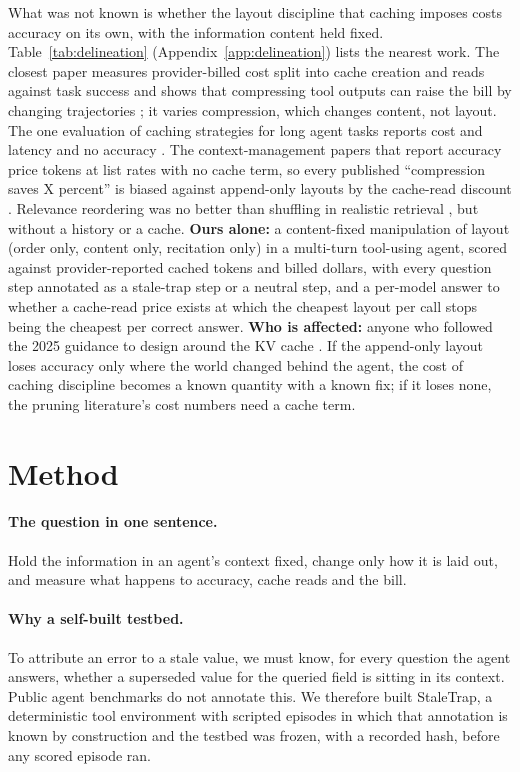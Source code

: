 What was not known is whether the layout discipline that caching imposes costs accuracy on its own, with the information content held fixed. Table~\ref{tab:delineation} (Appendix~\ref{app:delineation}) lists the nearest work. The closest paper measures provider-billed cost split into cache creation and reads against task success and shows that compressing tool outputs can raise the bill by changing trajectories \citep{a2607_12161}; it varies compression, which changes content, not layout. The one evaluation of caching strategies for long agent tasks reports cost and latency and no accuracy \citep{a2601_06007}. The context-management papers that report accuracy price tokens at list rates with no cache term, so every published ``compression saves X percent'' is biased against append-only layouts by the cache-read discount \citep{a2606_10209,a2605_18854,a2504_13359,a2510_11977}. Relevance reordering was no better than shuffling in realistic retrieval \citep{a2505_15561}, but without a history or a cache. \textbf{Ours alone:} a content-fixed manipulation of layout (order only, content only, recitation only) in a multi-turn tool-using agent, scored against provider-reported cached tokens and billed dollars, with every question step annotated as a stale-trap step or a neutral step, and a per-model answer to whether a cache-read price exists at which the cheapest layout per call stops being the cheapest per correct answer. \textbf{Who is affected:} anyone who followed the 2025 guidance to design around the KV cache \citep{manus2025,anthropic2025context}. If the append-only layout loses accuracy only where the world changed behind the agent, the cost of caching discipline becomes a known quantity with a known fix; if it loses none, the pruning literature's cost numbers need a cache term.

\section{Method}
\label{sec:method}

\paragraph{The question in one sentence.} Hold the information in an agent's context fixed, change only how it is laid out, and measure what happens to accuracy, cache reads and the bill.

\paragraph{Why a self-built testbed.} To attribute an error to a stale value, we must know, for every question the agent answers, whether a superseded value for the queried field is sitting in its context. Public agent benchmarks do not annotate this. We therefore built StaleTrap, a deterministic tool environment with scripted episodes in which that annotation is known by construction and the testbed was frozen, with a recorded hash, before any scored episode ran.

